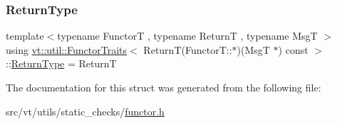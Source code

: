 \subsubsection{\texorpdfstring{Return\+Type}{ReturnType}}
{\footnotesize\ttfamily template$<$typename FunctorT , typename ReturnT , typename MsgT $>$ \\
using \hyperlink{structvt_1_1util_1_1_functor_traits}{vt\+::util\+::\+Functor\+Traits}$<$ ReturnT(Functor\+T\+::$\ast$)(MsgT $\ast$) const $>$\+::\hyperlink{structvt_1_1util_1_1_functor_traits_3_01_return_t_07_functor_t_1_1_5_08_07_msg_t_01_5_08_01const_01_4_ab9fead7f413753fc7e31305ff320d909}{Return\+Type} =  ReturnT}



The documentation for this struct was generated from the following file\+:\begin{DoxyCompactItemize}
\item 
src/vt/utils/static\+\_\+checks/\hyperlink{functor_8h}{functor.\+h}\end{DoxyCompactItemize}
